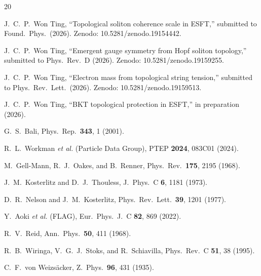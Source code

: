﻿\documentclass[twocolumn,showpacs,preprintnumbers,amsmath,amssymb,prc]{revtex4-2}
\begin{document}
\begin{thebibliography}{20}

 J.~C.~P.~Won Ting, ``Topological soliton coherence scale in ESFT,'' submitted to Found.\ Phys.\ (2026). Zenodo: 10.5281/zenodo.19154442.

 J.~C.~P.~Won Ting, ``Emergent gauge symmetry from Hopf soliton topology,'' submitted to Phys.\ Rev.\ D (2026). Zenodo: 10.5281/zenodo.19159255.

 J.~C.~P.~Won Ting, ``Electron mass from topological string tension,'' submitted to Phys.\ Rev.\ Lett.\ (2026). Zenodo: 10.5281/zenodo.19159513.

 J.~C.~P.~Won Ting, ``BKT topological protection in ESFT,'' in preparation (2026).

 G.~S.~Bali, Phys.\ Rep.\ \textbf{343}, 1 (2001).

 R.~L.~Workman \textit{et al.} (Particle Data Group), PTEP \textbf{2024}, 083C01 (2024).

 M.~Gell-Mann, R.~J.~Oakes, and B.~Renner, Phys.\ Rev.\ \textbf{175}, 2195 (1968).

 J.~M.~Kosterlitz and D.~J.~Thouless, J.\ Phys.\ C \textbf{6}, 1181 (1973).

 D.~R.~Nelson and J.~M.~Kosterlitz, Phys.\ Rev.\ Lett.\ \textbf{39}, 1201 (1977).

 Y.~Aoki \textit{et al.} (FLAG), Eur.\ Phys.\ J.\ C \textbf{82}, 869 (2022).

 R.~V.~Reid, Ann.\ Phys.\ \textbf{50}, 411 (1968).

 R.~B.~Wiringa, V.~G.~J.~Stoks, and R.~Schiavilla, Phys.\ Rev.\ C \textbf{51}, 38 (1995).

 C.~F.~von Weizs\"acker, Z.\ Phys.\ \textbf{96}, 431 (1935).

\end{thebibliography}
\end{document}
